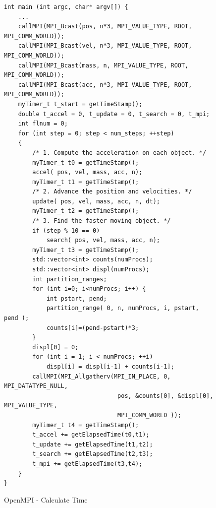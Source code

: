 \documentclass[12pt]{article} %
\begin{document}
\begin{figure}[]
\caption{OpenMPI - Calculate Time}\label{fig:benchmark01}
\begin{lstlisting}
int main (int argc, char* argv[]) {
    ...
    callMPI(MPI_Bcast(pos, n*3, MPI_VALUE_TYPE, ROOT, MPI_COMM_WORLD));
    callMPI(MPI_Bcast(vel, n*3, MPI_VALUE_TYPE, ROOT, MPI_COMM_WORLD));
    callMPI(MPI_Bcast(mass, n, MPI_VALUE_TYPE, ROOT, MPI_COMM_WORLD));
    callMPI(MPI_Bcast(acc, n*3, MPI_VALUE_TYPE, ROOT, MPI_COMM_WORLD));
    myTimer_t t_start = getTimeStamp();
    double t_accel = 0, t_update = 0, t_search = 0, t_mpi;
    int flnum = 0;
    for (int step = 0; step < num_steps; ++step)
    {
        /* 1. Compute the acceleration on each object. */
        myTimer_t t0 = getTimeStamp();
        accel( pos, vel, mass, acc, n);
        myTimer_t t1 = getTimeStamp();
        /* 2. Advance the position and velocities. */
        update( pos, vel, mass, acc, n, dt);
        myTimer_t t2 = getTimeStamp();
        /* 3. Find the faster moving object. */
        if (step % 10 == 0)
            search( pos, vel, mass, acc, n);
        myTimer_t t3 = getTimeStamp();
        std::vector<int> counts(numProcs);
        std::vector<int> displ(numProcs);
        int partition_ranges;
        for (int i=0; i<numProcs; i++) {
            int pstart, pend;
            partition_range( 0, n, numProcs, i, pstart, pend );
            counts[i]=(pend-pstart)*3;
        }
        displ[0] = 0;
        for (int i = 1; i < numProcs; ++i)
            displ[i] = displ[i-1] + counts[i-1];
        callMPI(MPI_Allgatherv(MPI_IN_PLACE, 0, MPI_DATATYPE_NULL,
                                pos, &counts[0], &displ[0], MPI_VALUE_TYPE,
                                MPI_COMM_WORLD ));
        myTimer_t t4 = getTimeStamp();
        t_accel += getElapsedTime(t0,t1);
        t_update += getElapsedTime(t1,t2);
        t_search += getElapsedTime(t2,t3);
        t_mpi += getElapsedTime(t3,t4);
    }
}
\end{lstlisting}
\end{figure}
\end{document}
